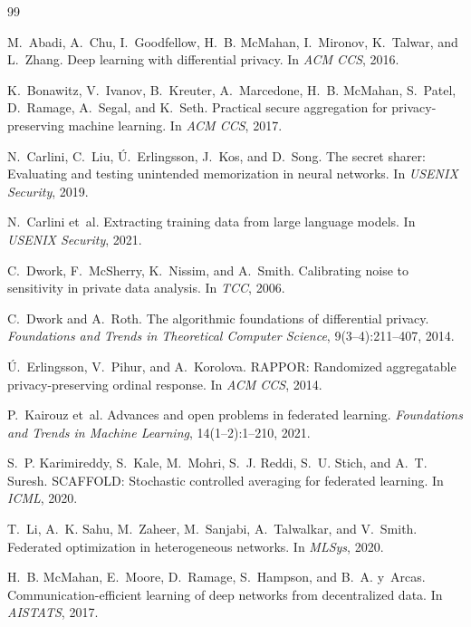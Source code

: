 \documentclass[11pt,a4paper]{article}
\begin{document}
\begin{thebibliography}{99}

M.~Abadi, A.~Chu, I.~Goodfellow, H.~B. McMahan, I.~Mironov, K.~Talwar, and
  L.~Zhang.
\newblock Deep learning with differential privacy.
\newblock In \emph{ACM CCS}, 2016.

K.~Bonawitz, V.~Ivanov, B.~Kreuter, A.~Marcedone, H.~B. McMahan, S.~Patel,
  D.~Ramage, A.~Segal, and K.~Seth.
\newblock Practical secure aggregation for privacy-preserving machine
  learning.
\newblock In \emph{ACM CCS}, 2017.

N.~Carlini, C.~Liu, Ú.~Erlingsson, J.~Kos, and D.~Song.
\newblock The secret sharer: Evaluating and testing unintended memorization in
  neural networks.
\newblock In \emph{USENIX Security}, 2019.

N.~Carlini et~al.
\newblock Extracting training data from large language models.
\newblock In \emph{USENIX Security}, 2021.

C.~Dwork, F.~McSherry, K.~Nissim, and A.~Smith.
\newblock Calibrating noise to sensitivity in private data analysis.
\newblock In \emph{TCC}, 2006.

C.~Dwork and A.~Roth.
\newblock The algorithmic foundations of differential privacy.
\newblock \emph{Foundations and Trends in Theoretical Computer Science},
  9(3--4):211--407, 2014.

Ú.~Erlingsson, V.~Pihur, and A.~Korolova.
\newblock RAPPOR: Randomized aggregatable privacy-preserving ordinal response.
\newblock In \emph{ACM CCS}, 2014.

P.~Kairouz et~al.
\newblock Advances and open problems in federated learning.
\newblock \emph{Foundations and Trends in Machine Learning}, 14(1--2):1--210,
  2021.

S.~P. Karimireddy, S.~Kale, M.~Mohri, S.~J. Reddi, S.~U. Stich, and A.~T.
  Suresh.
\newblock SCAFFOLD: Stochastic controlled averaging for federated learning.
\newblock In \emph{ICML}, 2020.

T.~Li, A.~K. Sahu, M.~Zaheer, M.~Sanjabi, A.~Talwalkar, and V.~Smith.
\newblock Federated optimization in heterogeneous networks.
\newblock In \emph{MLSys}, 2020.

H.~B. McMahan, E.~Moore, D.~Ramage, S.~Hampson, and B.~A. y~Arcas.
\newblock Communication-efficient learning of deep networks from decentralized
  data.
\newblock In \emph{AISTATS}, 2017.


\end{thebibliography}
\end{document}
